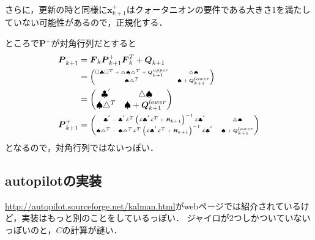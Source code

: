 さらに，更新の時と同様に$\boldsymbol{x}_{k+1}^{+}$はクォータニオンの要件である大きさ1を満たしていない可能性があるので，正規化する．

ところで$\boldsymbol{P}^{+}$が対角行列だとすると
\begin{align}
\boldsymbol{P}_{k+1}^{-} &= \boldsymbol{F}_{k} \boldsymbol{P}_{k+1}^{+} \boldsymbol{F}_{k}^{T} +
  \boldsymbol{Q}_{k+1}\\
  &=
  {\tiny
    \begin{pmatrix}
      \Box \clubsuit \Box^{T} + \triangle \spadesuit \triangle^{T} + \boldsymbol{Q}_{k+1}^{upper} & \triangle \spadesuit\\
      \spadesuit \triangle^{T} & \spadesuit + \boldsymbol{Q}_{k+1}^{lower}
    \end{pmatrix}
  }\\
  &=
  \begin{pmatrix}
    \clubsuit^{'} & \triangle \spadesuit\\
    \spadesuit \triangle^{T} & \spadesuit + \boldsymbol{Q}_{k+1}^{lower}
  \end{pmatrix}\\
  \boldsymbol{P}_{k+1}^{+} &=
  {\tiny
    \begin{pmatrix}
      \clubsuit^{'} - \clubsuit^{'} \pounds^{T} \left(\pounds \clubsuit^{'} \pounds^{T} + \boldsymbol{R}_{k+1}\right)^{-1} \pounds \clubsuit^{'} & \triangle \spadesuit\\
      \spadesuit \triangle^{T} - \spadesuit \triangle^{T} \pounds^{T} \left(\pounds \clubsuit^{'} \pounds^{T} + \boldsymbol{R}_{k+1}\right)^{-1} \pounds \clubsuit^{'} & \spadesuit + \boldsymbol{Q}_{k+1}^{lower}
    \end{pmatrix}
  }
\end{align}
となるので，対角行列ではないっぽい．

\subsection{autopilotの実装}
\url{http://autopilot.sourceforge.net/kalman.html}がwebページでは紹介されているけど，実装はもっと別のことをしているっぽい．
ジャイロが2つしかついていないっぽいのと，$C$の計算が謎い．

